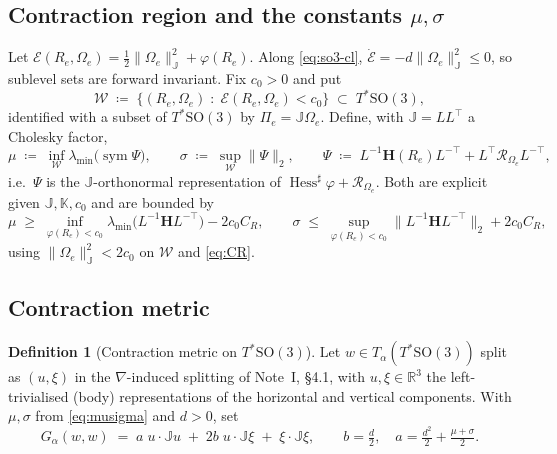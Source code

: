 \documentclass[11pt,a4paper]{article}
\newcommand{\Rm}{\mathbb{R}}
\newcommand{\Jm}{\mathbb{J}}
\newcommand{\Km}{\mathbb{K}}
\newcommand{\Hess}{\operatorname{Hess}}
\newcommand{\Jac}{\mathcal{R}}
\newcommand{\normJ}[1]{\lVert #1 \rVert_{\Jm}}
\newcommand{\sym}{\operatorname{sym}}
\newcommand{\SO}{\mathrm{SO}(3)}
\newcommand{\Ome}{\Omega_{\!e}}
\theoremstyle{plain}
\theoremstyle{definition}
\newtheorem{definition}[theorem]{Definition}
\theoremstyle{remark}
\begin{document}
\subsection{Contraction region and the constants $\mu,\sigma$}

Let $\mathcal{E}(R_e,\Ome) = \tfrac12\normJ{\Ome}^2 + \varphi(R_e)$. Along
\eqref{eq:so3-cl}, $\dot{\mathcal{E}} = -d\normJ{\Ome}^2 \le 0$, so sublevel sets
are forward invariant. Fix $c_0>0$ and put
\begin{equation}
  \mathcal{W} \;\coloneqq\; \big\{(R_e,\Ome) \;:\; \mathcal{E}(R_e,\Ome) < c_0 \big\}
  \;\subset\; T^{*}\SO ,
  \label{eq:W}
\end{equation}
identified with a subset of $T^{*}\SO$ by $\Pi_e = \Jm\Ome$. Define, with
$\Jm = L L^{\top}$ a Cholesky factor,
\begin{equation}
  \mu \;\coloneqq\; \inf_{\mathcal{W}} \lambda_{\min}\!\big(\sym\Psi\big),
  \qquad
  \sigma \;\coloneqq\; \sup_{\mathcal{W}} \big\|\Psi\big\|_2,
  \qquad
  \Psi \;\coloneqq\; L^{-1}\mathbf{H}(R_e)L^{-\top} + L^{\top}\Jac_{\Ome}L^{-\top},
  \label{eq:musigma}
\end{equation}
i.e.\ $\Psi$ is the $\Jm$-orthonormal representation of
$\Hess^{\sharp}\varphi + \Jac_{\Ome}$. Both are explicit given $\Jm,\Km,c_0$ and
are bounded by
\begin{equation}
  \mu \;\ge\; \inf_{\varphi(R_e)<c_0}\lambda_{\min}\big(L^{-1}\mathbf{H}L^{-\top}\big) - 2c_0C_R,
  \qquad
  \sigma \;\le\; \sup_{\varphi(R_e)<c_0}\big\|L^{-1}\mathbf{H}L^{-\top}\big\|_2 + 2c_0C_R ,
  \label{eq:musigma-bnd}
\end{equation}
using $\normJ{\Ome}^2 < 2c_0$ on $\mathcal{W}$ and \eqref{eq:CR}.

\subsection{Contraction metric}

\begin{definition}[Contraction metric on $T^{*}\SO$]
\label{def:so3-metric}
Let $w\in T_\alpha(T^{*}\SO)$ split as $(u,\xi)$ in the $\nabla$-induced splitting
of Note~I, \S4.1, with $u,\xi\in\Rm^3$ the left-trivialised (body) representations
of the horizontal and vertical components. With $\mu,\sigma$ from
\eqref{eq:musigma} and $d>0$, set
\begin{equation}
  \boxed{\;
  G_\alpha(w,w) \;=\; a\;u\cdot\Jm u \;+\; 2b\;u\cdot\Jm\xi \;+\; \xi\cdot\Jm\xi,
  \qquad
  b = \tfrac{d}{2},
  \quad
  a = \tfrac{d^2}{2} + \tfrac{\mu+\sigma}{2}. \;}
  \label{eq:so3-G}
\end{equation}
\end{definition}
\end{document}

